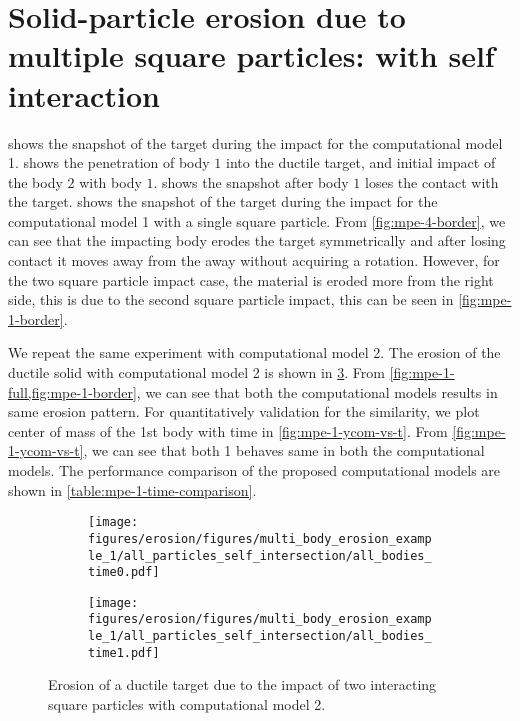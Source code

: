 \FloatBarrier%
\section{Solid-particle erosion due to multiple square particles: with
  self interaction}
\label{sec:erosion-multiple-impact-self-interact}

 shows the snapshot of the target during the impact for
the computational model 1.  shows the penetration of
body $1$ into the ductile target, and initial impact of the body $2$ with body
$1$.  shows the snapshot after body $1$ loses the
contact with the target.  shows the snapshot of the
target during the impact for the computational model 1 with a single square
particle. From \cref{fig:mpe-4-border}, we can see that the impacting body
erodes the target symmetrically and after losing contact it moves away from the
away without acquiring a rotation. However, for the two square particle impact
case, the material is eroded more from the right side, this is due to the second
square particle impact, this can be seen in \cref{fig:mpe-1-border}.

We repeat the same experiment with computational model 2. The erosion of the
ductile solid with computational model 2 is shown in \cref{fig:mpe-1-full}. From
\cref{fig:mpe-1-full,fig:mpe-1-border}, we can see that both the computational
models results in same erosion pattern. For quantitatively validation for the
similarity, we plot center of mass of the 1st body with time in
\cref{fig:mpe-1-ycom-vs-t}. From \cref{fig:mpe-1-ycom-vs-t}, we can see that
both 1 behaves same in both the computational models. The performance comparison
of the proposed computational models are shown in
\cref{table:mpe-1-time-comparison}.
\begin{figure}[!htpb]
  \centering
  \begin{subfigure}{0.48\textwidth}
    \centering
    \texttt{[image: figures/erosion/figures/multi\_body\_erosion\_example\_1/all\_particles\_self\_intersection/all\_bodies\_time0.pdf]}
    \subcaption{}
    \label{fig:mpe-1-full-a}
  \end{subfigure}
  \begin{subfigure}{0.48\textwidth}
    \centering
    \texttt{[image: figures/erosion/figures/multi\_body\_erosion\_example\_1/all\_particles\_self\_intersection/all\_bodies\_time1.pdf]}
    \subcaption{}
    \label{fig:mpe-1-full-b}
  \end{subfigure}
  \caption{Erosion of a ductile target due to the impact of two interacting
    square particles with computational model 2.}
\label{fig:mpe-1-full}
\end{figure}

